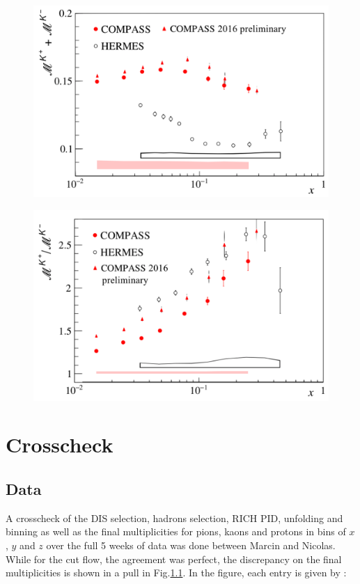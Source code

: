 \documentclass[letterpaper,12pt]{article}
\begin{document}
\begin{figure}[H]
	\includegraphics[scale=0.38]{./gfx/Ks.png}
	\caption{}
	\label{Ks}
\end{figure}

\begin{figure}[H]
	\includegraphics[scale=0.38]{./gfx/Kr.png}
	\caption{}
	\label{Kr}
\end{figure}

\appendix

\section{Crosscheck} \label{XC}

\subsection{Data}

A crosscheck of the DIS selection, hadrons selection, RICH PID, unfolding and binning as well as the final multiplicities for pions, kaons and protons in bins of $x$, $y$ and $z$ over the full 5 weeks of data was done between Marcin and Nicolas. While for the cut flow, the agreement was perfect, the discrepancy on the final multiplicities is shown in a pull in Fig.\ref{}. In the figure, each entry is given by :
\end{document}
